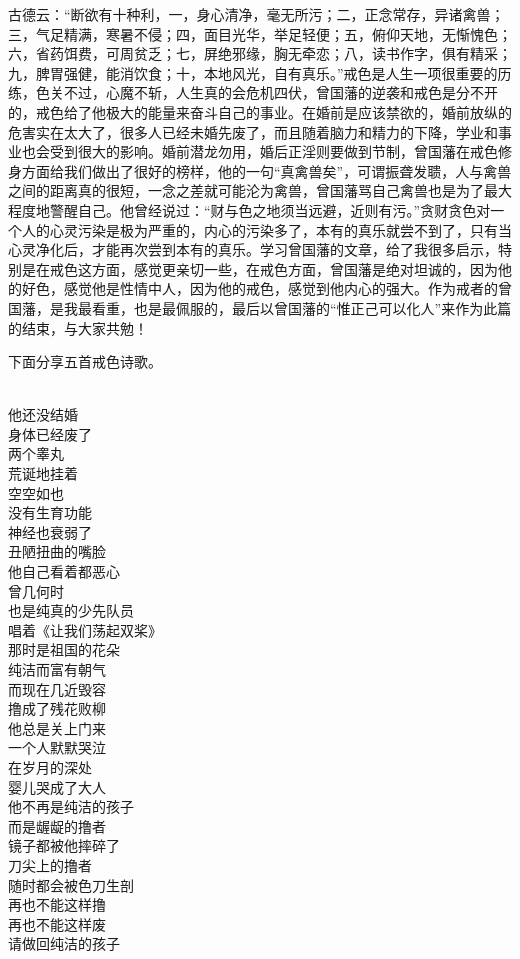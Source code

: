 古德云：“断欲有十种利，一，身心清净，毫无所污；二，正念常存，异诸禽兽；三，气足精满，寒暑不侵；四，面目光华，举足轻便；五，俯仰天地，无惭愧色；六，省药饵费，可周贫乏；七，屏绝邪缘，胸无牵恋；八，读书作字，俱有精采；九，脾胃强健，能消饮食；十，本地风光，自有真乐。”戒色是人生一项很重要的历练，色关不过，心魔不斩，人生真的会危机四伏，曾国藩的逆袭和戒色是分不开的，戒色给了他极大的能量来奋斗自己的事业。在婚前是应该禁欲的，婚前放纵的危害实在太大了，很多人已经未婚先废了，而且随着脑力和精力的下降，学业和事业也会受到很大的影响。婚前潜龙勿用，婚后正淫则要做到节制，曾国藩在戒色修身方面给我们做出了很好的榜样，他的一句“真禽兽矣”，可谓振聋发聩，人与禽兽之间的距离真的很短，一念之差就可能沦为禽兽，曾国藩骂自己禽兽也是为了最大程度地警醒自己。他曾经说过：“财与色之地须当远避，近则有污。”贪财贪色对一个人的心灵污染是极为严重的，内心的污染多了，本有的真乐就尝不到了，只有当心灵净化后，才能再次尝到本有的真乐。学习曾国藩的文章，给了我很多启示，特别是在戒色这方面，感觉更亲切一些，在戒色方面，曾国藩是绝对坦诚的，因为他的好色，感觉他是性情中人，因为他的戒色，感觉到他内心的强大。作为戒者的曾国藩，是我最看重，也是最佩服的，最后以曾国藩的“惟正己可以化人”来作为此篇的结束，与大家共勉！

下面分享五首戒色诗歌。

\begin{poem}[刀尖上的撸者]
    \begin{multicols}{2}
        \begin{center}~\\
            他还没结婚 \\ 身体已经废了 \\ 两个睾丸 \\ 荒诞地挂着 \\ 空空如也 \\ 没有生育功能 \\ 神经也衰弱了 \\ 丑陋扭曲的嘴脸 \\ 他自己看着都恶心 \\ 曾几何时 \\ 也是纯真的少先队员 \\ 唱着《让我们荡起双桨》 \\ 那时是祖国的花朵 \\ 纯洁而富有朝气 \\ 而现在几近毁容 \\ 撸成了残花败柳 \\ 他总是关上门来 \\ 一个人默默哭泣 \\ 在岁月的深处 \\ 婴儿哭成了大人 \\ 他不再是纯洁的孩子 \\ 而是龌龊的撸者 \\ 镜子都被他摔碎了 \\ 刀尖上的撸者 \\ 随时都会被色刀生剖 \\ 再也不能这样撸 \\ 再也不能这样废 \\ 请做回纯洁的孩子
        \end{center}
    \end{multicols}
\end{poem}

